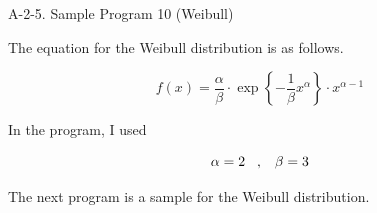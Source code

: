 \noindent
{\Large A-2-5. Sample Program 10 (Weibull)}

\vspace*{7mm}

\noindent
The equation for the Weibull distribution is as follows.

\begin{equation}
f(x) = \frac{\alpha}{\beta} \cdot \exp \left\{ - \frac{1}{\beta} x^\alpha \right\} \cdot x^{\alpha-1}
\end{equation}

\noindent
In the program, I used

\begin{equation}
\alpha = 2  \hspace{3mm} , \hspace{3mm} \beta = 3
\end{equation}

\vspace*{5mm}

\noindent
The next program is a sample for the Weibull distribution.

\clearpage


